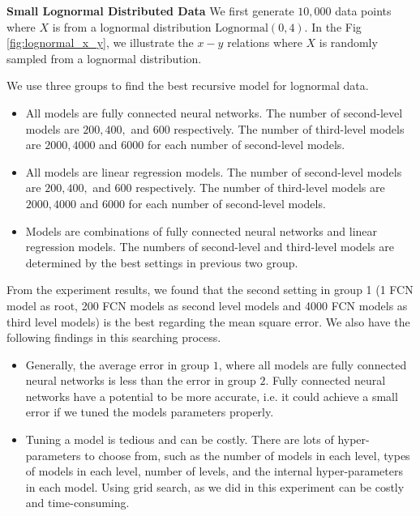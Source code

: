 \textbf{Small Lognormal Distributed Data} We first generate $10,000$ data points where $X$ is from a lognormal distribution $\text{Lognormal}(0, 4)$. In the Fig \ref{fig:lognormal_x_y}, we illustrate the $x-y$ relations where $X$ is randomly sampled from a lognormal distribution.



We use three groups to find the best recursive model for lognormal data.
\begin{itemize}
	\item All models are fully connected neural networks. The number of second-level models are $200, 400,$ and $600$ respectively. The number of third-level models are $2000, 4000$ and $6000$ for each number of second-level models.
	\item All models are linear regression models. The number of second-level models are $200, 400,$ and $600$ respectively. The number of third-level models are $2000, 4000$ and $6000$ for each number of second-level models.
	\item Models are combinations of fully connected neural networks and linear regression models. The numbers of second-level and third-level models are determined by the best settings in previous two group.
\end{itemize}

\begin{figure}
	
\end{figure}

From the experiment results, we found that the second setting in group 1 (1 FCN model as root, 200 FCN models as second level models and 4000 FCN models as third level models) is the best regarding the mean square error. We also have the following findings in this searching process.

\begin{itemize}
	\item Generally, the average error in group $1$, where all models are fully connected neural networks is less than the error in group $2$. Fully connected neural networks have a potential to be more accurate, i.e. it could achieve a small error if we tuned the models parameters properly.
	\item Tuning a model is tedious and can be costly. There are lots of hyper-parameters to choose from, such as the number of models in each level, types of models in each level, number of levels, and the internal hyper-parameters in each model. Using grid search, as we did in this experiment can be costly and time-consuming.
\end{itemize}

